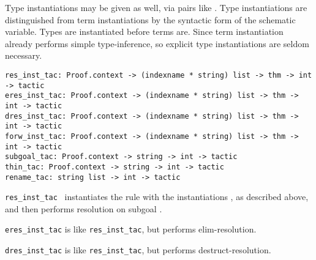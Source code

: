 \begin{isabellebody}
\begin{isamarkuptext}
  Type instantiations may be given as well, via pairs like .  Type instantiations are distinguished from term
  instantiations by the syntactic form of the schematic variable.
  Types are instantiated before terms are.  Since term instantiation
  already performs simple type-inference, so explicit type
  instantiations are seldom necessary.%
\end{isamarkuptext}%
\isamarkuptrue%
%
\isadelimmlref
%
\endisadelimmlref
%
\isatagmlref
%
\begin{isamarkuptext}%
\begin{mldecls}
  \verb|res_inst_tac: Proof.context -> (indexname * string) list -> thm -> int -> tactic| \\
  \verb|eres_inst_tac: Proof.context -> (indexname * string) list -> thm -> int -> tactic| \\
  \verb|dres_inst_tac: Proof.context -> (indexname * string) list -> thm -> int -> tactic| \\
  \verb|forw_inst_tac: Proof.context -> (indexname * string) list -> thm -> int -> tactic| \\
  \verb|subgoal_tac: Proof.context -> string -> int -> tactic| \\
  \verb|thin_tac: Proof.context -> string -> int -> tactic| \\
  \verb|rename_tac: string list -> int -> tactic| \\
  \end{mldecls}

  \begin{description}

  \item \verb|res_inst_tac|~ instantiates the
  rule  with the instantiations , as described
  above, and then performs resolution on subgoal .
  
  \item \verb|eres_inst_tac| is like \verb|res_inst_tac|, but performs
  elim-resolution.

  \item \verb|dres_inst_tac| is like \verb|res_inst_tac|, but performs
  destruct-resolution.


\end{description}
\end{isamarkuptext}
\end{isabellebody}
